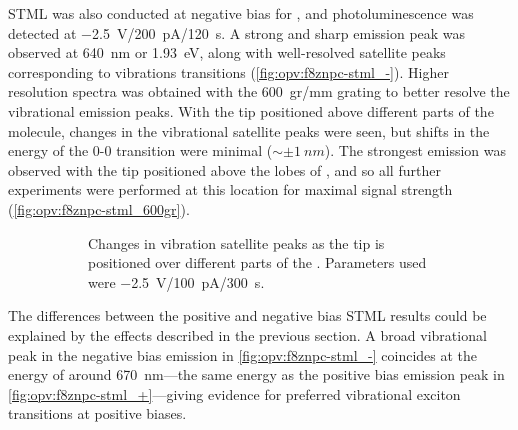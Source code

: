 \ac{STML} was also conducted at negative bias for , and photoluminescence was detected at \SI{-2.5}{V}/\SI{200}{pA}/\SI{120}{s}. A strong and sharp emission peak was observed at \SI{640}{nm} or \SI{1.93}{eV}, along with well-resolved satellite peaks corresponding to vibrations transitions (\autoref{fig:opv:f8znpc-stml_-}). Higher resolution spectra was obtained with the \SI{600}{gr/mm} grating to better resolve the vibrational emission peaks. With the tip positioned above different parts of the molecule, changes in the vibrational satellite peaks were seen, but shifts in the energy of the 0-0 transition were minimal ($\sim \pm \SI{1}{nm}$). The strongest emission was observed with the tip positioned above the lobes of , and so all further experiments were performed at this location for maximal signal strength (\autoref{fig:opv:f8znpc-stml_600gr}).


\begin{figure} [h]
    \centering
    
     \begin{subfigure}{0.45\textwidth}
        \caption{}
        \label{fig:opv:f8znpc-stml_-}
    \end{subfigure}
    
    \begin{subfigure}{0.45\textwidth}
        \caption{Changes in vibration satellite peaks as the tip is positioned over different parts of the . Parameters used were \SI{-2.5}{V}/\SI{100}{pA}/\SI{300}{s}.}
        \label{fig:opv:f8znpc-stml_600gr}
    \end{subfigure}
    
    \caption{}
    
\end{figure}

The differences between the positive and negative bias \ac{STML} results could be explained by the effects described in the previous section. A broad vibrational peak in the negative bias emission in \autoref{fig:opv:f8znpc-stml_-} coincides at the energy of around \SI{670}{nm}---the same energy as the positive bias emission peak in \autoref{fig:opv:f8znpc-stml_+}---giving evidence for preferred vibrational exciton transitions at positive biases.



